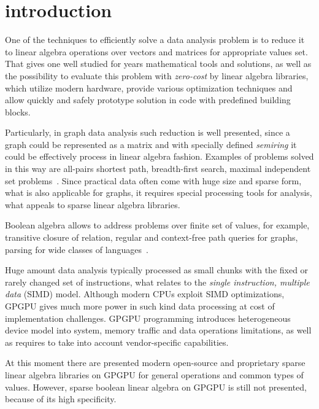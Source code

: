 \section{introduction}


One of the techniques to efficiently solve a data analysis problem is to reduce it to linear algebra operations over vectors and matrices for appropriate values set.
That gives one well studied for years mathematical tools and solutions, as well as the possibility to evaluate this problem with \textit{zero-cost} by linear algebra libraries, which utilize modern hardware, provide various optimization techniques and allow quickly and safely prototype solution in code with predefined building blocks.

Particularly, in graph data analysis such reduction is well presented, since a graph could be 
represented as a matrix and with specially defined \textit{semiring} it could be effectively 
process in linear algebra fashion.
Examples of problems solved in this way are all-pairs shortest path, breadth-first search, maximal independent set problems~\cite{todo}.
Since practical data often come with huge size and sparse form, what is also applicable for graphs, it requires special processing tools for analysis, what appeals to sparse linear algebra libraries.

Boolean algebra allows to address problems over finite set of values, for example, transitive closure of relation, regular and context-free path queries for graphs, parsing for wide classes of languages~\cite{10.5555/972525.972527, OKHOTIN2014101, !!!}.

Huge amount data analysis typically processed as small chunks with the fixed or rarely changed set 
of instructions, what relates to the \textit{single instruction, multiple data} (SIMD) model. 
Although modern CPUs exploit SIMD optimizations, GPGPU gives much more power in such kind data 
processing at cost of implementation challenges. GPGPU programming introduces heterogeneous device 
model into system, memory traffic and data operations limitations, as well as requires to take into
account vendor-specific capabilities. 

At this moment there are presented modern open-source and proprietary sparse linear algebra 
libraries on GPGPU for general operations and common types of values. However, sparse boolean 
linear algebra on GPGPU is still not presented, because of its high specificity. 

